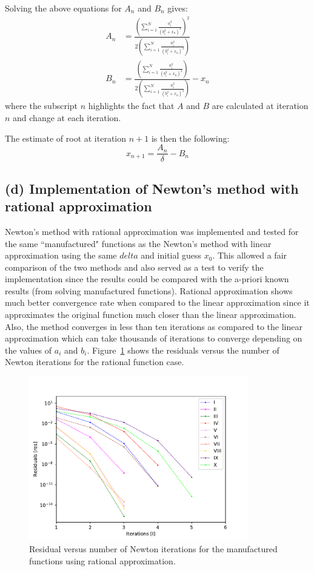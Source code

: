 \documentclass[11pt, oneside]{article}
\begin{document}
	Solving the above equations for  $A_n$ and $B_n$ gives:
	\begin{align}
		A_n &= \frac{\left(\sum_{i=1}^N \frac{a_i^2}{(b_i^2+x_n)^2}\right)^2}{2\left(\sum_{i=1}^N \frac{a_i^2}{(b_i^2+x_n)^3}\right)} \\
		B_n &= \frac{\left(\sum_{i=1}^N \frac{a_i^2}{(b_i^2+x_n)^2}\right)}{2\left(\sum_{i=1}^N \frac{a_i^2}{(b_i^2+x_n)^3}\right)} - x_n
	\end{align}
	where the subscript $n$ highlights the fact that $A$ and $B$ are calculated at iteration $n$ and change at each iteration.
	
	The estimate of root at iteration $n+1$ is then the following:
	\begin{equation}
		x_{n+1} = \frac{A_n}{\delta} - B_n
	\end{equation}
	
\subsection*{(d) Implementation of Newton's method with rational approximation}
	Newton's method with rational approximation was implemented and tested for the same ``manufactured" functions  as the Newton's method with linear approximation using the same $delta$ and initial guess $x_0$. This allowed a fair comparison of the two methods and also served as a test to verify the implementation since the results could be compared with the a-priori known results (from solving manufactured functions). Rational approximation shows much better convergence rate when compared to the linear approximation since it approximates the original function much closer than the linear approximation. Also, the method converges in  less than ten iterations as compared to the linear approximation which can take thousands of iterations to converge depending on the values of $a_i$ and $b_i$. Figure~\ref{fig:residuals_newton_modified} shows the residuals versus the number of Newton iterations for the rational function case.
	\begin{figure}[htbp]
		\begin{center}
		\includegraphics[width=0.85\textwidth]{figure/Newton_Modified_Test.pdf}
		\caption{Residual versus number of Newton iterations for the manufactured functions using rational approximation.}
		\label{fig:residuals_newton_modified}
		\end{center}
	\end{figure}
	
\end{document}
